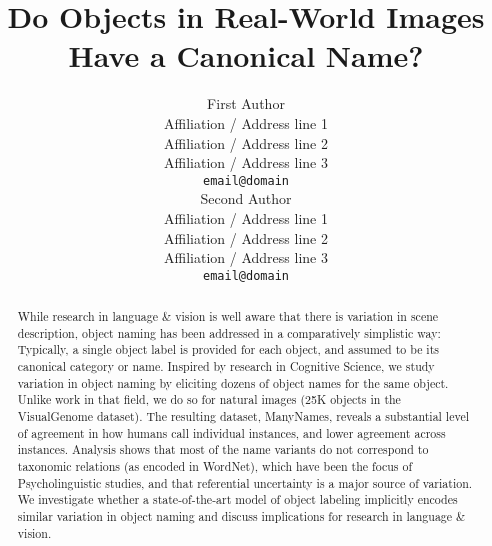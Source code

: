 \documentclass[11pt,a4paper]{article}
\title{Do Objects in Real-World Images Have a Canonical Name?}
\author{First Author \\
  Affiliation / Address line 1 \\
  Affiliation / Address line 2 \\
  Affiliation / Address line 3 \\
  {\tt email@domain} \\\And
  Second Author \\
  Affiliation / Address line 1 \\
  Affiliation / Address line 2 \\
  Affiliation / Address line 3 \\
  {\tt email@domain} \\}
\date{}
\newcommand{\cs}[1]{\textcolor{green}{\emph{//cs: #1//}}}
\begin{document}
\maketitle

\begin{abstract}
  While research in language \& vision is well aware that there is variation in scene description, object naming has been addressed in a comparatively simplistic way: Typically, a single object label is provided for each object, and assumed to be its canonical category or name.
  Inspired by research in Cognitive Science, we study variation in object naming by eliciting dozens of object names for the same object.
  Unlike work in that field, we do so for natural images (25K objects in the VisualGenome dataset).
The resulting dataset, ManyNames, reveals a substantial level of agreement in how humans call individual instances, and lower agreement across instances.
Analysis shows that most of the name variants do not correspond to taxonomic relations (as encoded in WordNet), which have been the focus of Psycholinguistic studies, and that referential uncertainty is a major source of variation.
We investigate whether a state-of-the-art model of object labeling implicitly encodes similar variation in object naming and discuss implications for research in language \& vision.
\end{abstract}
\end{document}
